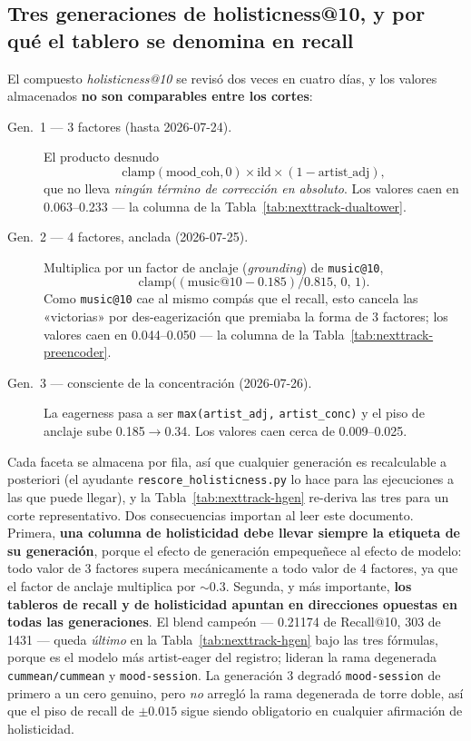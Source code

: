 \documentclass[11pt]{article}
\begin{document}
\subsection{Tres generaciones de holisticness@10, y por qué el tablero se denomina en recall}
\label{sec:nexttrack-power-generations}
El compuesto \emph{holisticness@10} se revisó dos veces en cuatro días, y los
valores almacenados \textbf{no son comparables entre los cortes}:
\begin{description}
  \item[Gen.\ 1 --- 3 factores (hasta 2026-07-24).] El producto desnudo
  \[\mathrm{clamp}(\text{mood\_coh},0)\times\text{ild}\times(1-\text{artist\_adj}),\]
  que no lleva \emph{ningún término de corrección en absoluto}. Los valores caen
  en \numrange{0.063}{0.233} --- la columna de la Tabla~\ref{tab:nexttrack-dualtower}.
  \item[Gen.\ 2 --- 4 factores, anclada (2026-07-25).] Multiplica por un factor
  de anclaje (\emph{grounding}) de \texttt{music@10},
  \[\mathrm{clamp}\bigl((\text{music@10}-\num{0.185})/\num{0.815},\,0,\,1\bigr).\]
  Como \texttt{music@10} cae al mismo compás que el recall, esto cancela las
  «victorias» por des-eagerización que premiaba la forma de 3 factores; los
  valores caen en \numrange{0.044}{0.050} --- la columna de la
  Tabla~\ref{tab:nexttrack-preencoder}.
  \item[Gen.\ 3 --- consciente de la concentración (2026-07-26).] La eagerness
  pasa a ser \texttt{max(artist\_adj,} \texttt{artist\_conc)} y el piso de
  anclaje sube \num{0.185}$\to$\num{0.34}. Los valores caen cerca de
  \numrange{0.009}{0.025}.
\end{description}
Cada faceta se almacena por fila, así que cualquier generación es recalculable a
posteriori (el ayudante \texttt{rescore\_holisticness.py} lo hace para las
ejecuciones a las que puede llegar), y la Tabla~\ref{tab:nexttrack-hgen} re-deriva las tres
para un corte representativo. Dos consecuencias importan al leer este documento.
Primera, \textbf{una columna de holisticidad debe llevar siempre la etiqueta de su
generación}, porque el efecto de generación empequeñece al efecto de modelo: todo
valor de 3 factores supera mecánicamente a todo valor de 4 factores, ya que el
factor de anclaje multiplica por ${\sim}0.3$. Segunda, y más importante,
\textbf{los tableros de recall y de holisticidad apuntan en direcciones opuestas
en todas las generaciones}. El blend campeón --- \num{0.21174} de Recall@10,
\num{303} de \num{1431} --- queda \emph{último} en la Tabla~\ref{tab:nexttrack-hgen} bajo
las tres fórmulas, porque es el modelo más artist-eager del registro; lideran la
rama degenerada \texttt{cummean/cummean} y \texttt{mood-session}. La generación 3
degradó \texttt{mood-session} de primero a un cero genuino, pero \emph{no}
arregló la rama degenerada de torre doble, así que el piso de recall de
$\pm\num{0.015}$ sigue siendo obligatorio en cualquier afirmación de
holisticidad.
\end{document}
